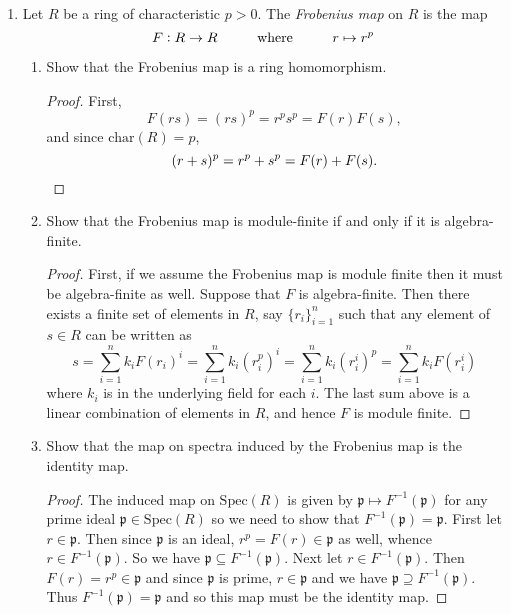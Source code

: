\documentclass[11pt,oneside,english]{amsart}
\theoremstyle{definition}
\newcommand{\MF}[1]{\mathfrak{#1}}
\begin{document}
\begin{enumerate}[leftmargin=*]
\begin{enumerate}
\end{enumerate}


\item Let $R$ be a ring of characteristic $p>0$. The \textit{Frobenius map} on $R$ is the map 
\[
F:R\to R\hspace{10mm}\text{where}\hspace{10mm}r\mapsto r^p
\]
\begin{enumerate}
\item Show that the Frobenius map is a ring homomorphism.
\begin{proof}
First,
\[
F(rs)=(rs)^p=r^ps^p=F(r)F(s),
\]
and since $\text{char}(R)=p$,
\[
(r+s)^p=r^p+s^p=F(r)+F(s).\qedhere
\]
\end{proof}

\item Show that the Frobenius map is module-finite if and only if it is algebra-finite.
\begin{proof}
First, if we assume the Frobenius map is module finite then it must be algebra-finite as well. Suppose that $F$ is algebra-finite. Then there exists a finite set of elements in $R$, say $\{r_i\}_{i=1}^n$ such that any element of $s\in R$ can be written as
\[
s=\sum_{i=1}^nk_iF(r_i)^i=\sum_{i=1}^nk_i(r_i^p)^i=\sum_{i=1}^nk_i(r_i^i)^p=\sum_{i=1}^nk_iF(r_i^i)
\]
where $k_i$ is in the underlying field for each $i$. The last sum above is a linear combination of elements in $R$, and hence $F$ is module finite.
\end{proof}

\pagebreak

\item Show that the map on spectra induced by the Frobenius map is the identity map.

\begin{proof}
The induced map on $\text{Spec}(R)$ is given by $\MF{p}\mapsto F^{-1}(\MF{p})$ for any prime ideal $\MF{p}\in\text{Spec}(R)$ so we need to show that $F^{-1}(\MF{p})=\MF{p}$. First let $r\in\MF{p}$. Then since $\MF{p}$ is an ideal, $r^p=F(r)\in\MF{p}$ as well, whence $r\in F^{-1}(\MF{p})$. So we have $\MF{p}\subseteq F^{-1}(\MF{p})$. Next let $r\in F^{-1}(\MF{p})$. Then $F(r)=r^p\in\MF{p}$ and since $\MF{p}$ is prime, $r\in \MF{p}$ and we have $\MF{p}\supseteq F^{-1}(\MF{p})$. Thus $F^{-1}(\MF{p})=\MF{p}$ and so this map must be the identity map.
\end{proof}
\end{enumerate}


\end{enumerate}
\end{document}

